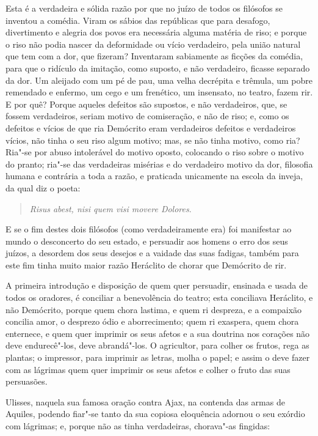 Esta é a verdadeira e sólida razão por que no juízo de todos os
filósofos se inventou a comédia. Viram os sábios das repúblicas que para
desafogo, divertimento e alegria dos povos era necessária alguma matéria
de riso; e porque o riso não podia nascer da deformidade ou vício
verdadeiro, pela união natural que tem com a dor, que fizeram?
Inventaram sabiamente as ficções da comédia, para que o ridículo da
imitação, como suposto, e não verdadeiro, ficasse separado da dor. Um
aleijado com um pé de pau, uma velha decrépita e trêmula, um pobre
remendado e enfermo, um cego e um frenético, um insensato, no teatro,
fazem rir. E por quê? Porque aqueles defeitos são supostos, e não
verdadeiros, que, se fossem verdadeiros, seriam motivo de comiseração, e
não de riso; e, como os defeitos e vícios de que ria Demócrito eram
verdadeiros defeitos e verdadeiros vícios, não tinha o seu riso algum
motivo; mas, se não tinha motivo, como ria? Ria"-se por abuso intolerável
do motivo oposto, colocando o riso sobre o motivo do pranto; ria"-se das
verdadeiras misérias e do verdadeiro motivo da dor, filosofia humana e
contrária a toda a razão, e praticada unicamente na escola da inveja, da
qual diz o poeta:

\begin{verse}
\emph{Risus abest, nisi quem visi movere Dolores}.
\end{verse}

E se o fim destes dois filósofos (como verdadeiramente era) foi
manifestar ao mundo o desconcerto do seu estado, e persuadir aos homens
o erro dos seus juízos, a desordem dos seus desejos e a vaidade das suas
fadigas, também para este fim tinha muito maior razão Heráclito de
chorar que Demócrito de rir.

A primeira introdução e disposição de quem quer persuadir, ensinada e
usada de todos os oradores, é conciliar a benevolência do teatro; esta
conciliava Heráclito, e não Demócrito, porque quem chora lastima, e quem
ri despreza, e a compaixão concilia amor, o desprezo ódio e
aborrecimento; quem ri exaspera, quem chora enternece, e quem quer
imprimir os seus afetos e a sua doutrina nos corações não deve
endurecê"-los, deve abrandá"-los. O agricultor, para colher os frutos,
rega as plantas; o impressor, para imprimir as letras, molha o papel; e
assim o deve fazer com as lágrimas quem quer imprimir os seus afetos e
colher o fruto das suas persuasões.

Ulisses, naquela sua famosa oração contra Ajax, na contenda das armas de
Aquiles, podendo fiar"-se tanto da sua copiosa eloquência adornou o seu
exórdio com lágrimas; e, porque não as tinha verdadeiras, chorava"-as
fingidas:

